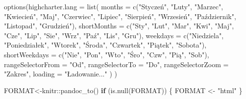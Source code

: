 \documentclass[
  polish,
  letterpaper,
  DIV=11,
  numbers=noendperiod]{scrartcl}
\newenvironment{Shaded}{\begin{snugshade}}{\end{snugshade}}
\newcommand{\AttributeTok}[1]{\textcolor[rgb]{0.40,0.45,0.13}{#1}}
\newcommand{\ControlFlowTok}[1]{\textcolor[rgb]{0.00,0.23,0.31}{\textbf{#1}}}
\newcommand{\FunctionTok}[1]{\textcolor[rgb]{0.28,0.35,0.67}{#1}}
\newcommand{\NormalTok}[1]{\textcolor[rgb]{0.00,0.23,0.31}{#1}}
\newcommand{\OtherTok}[1]{\textcolor[rgb]{0.00,0.23,0.31}{#1}}
\newcommand{\SpecialCharTok}[1]{\textcolor[rgb]{0.37,0.37,0.37}{#1}}
\newcommand{\StringTok}[1]{\textcolor[rgb]{0.13,0.47,0.30}{#1}}
\begin{document}
\begin{Shaded}
\begin{Highlighting}[]
\FunctionTok{options}\NormalTok{(}\AttributeTok{highcharter.lang =} \FunctionTok{list}\NormalTok{(}
    \AttributeTok{months =} \FunctionTok{c}\NormalTok{(}\StringTok{"Styczeń"}\NormalTok{, }\StringTok{"Luty"}\NormalTok{, }\StringTok{"Marzec"}\NormalTok{, }\StringTok{"Kwiecień"}\NormalTok{, }\StringTok{"Maj"}\NormalTok{, }\StringTok{"Czerwiec"}\NormalTok{, }
               \StringTok{"Lipiec"}\NormalTok{, }\StringTok{"Sierpień"}\NormalTok{, }\StringTok{"Wrzesień"}\NormalTok{, }\StringTok{"Październik"}\NormalTok{, }
               \StringTok{"Listopad"}\NormalTok{, }\StringTok{"Grudzień"}\NormalTok{),}
    \AttributeTok{shortMonths =} \FunctionTok{c}\NormalTok{(}\StringTok{"Sty"}\NormalTok{, }\StringTok{"Lut"}\NormalTok{, }\StringTok{"Mar"}\NormalTok{, }\StringTok{"Kwi"}\NormalTok{, }\StringTok{"Maj"}\NormalTok{, }\StringTok{"Cze"}\NormalTok{, }
                    \StringTok{"Lip"}\NormalTok{, }\StringTok{"Sie"}\NormalTok{, }\StringTok{"Wrz"}\NormalTok{, }\StringTok{"Paź"}\NormalTok{, }\StringTok{"Lis"}\NormalTok{, }\StringTok{"Gru"}\NormalTok{),}
    \AttributeTok{weekdays =} \FunctionTok{c}\NormalTok{(}\StringTok{"Niedziela"}\NormalTok{, }\StringTok{"Poniedziałek"}\NormalTok{, }\StringTok{"Wtorek"}\NormalTok{, }\StringTok{"Środa"}\NormalTok{, }\StringTok{"Czwartek"}\NormalTok{, }
                 \StringTok{"Piątek"}\NormalTok{, }\StringTok{"Sobota"}\NormalTok{),}
    \AttributeTok{shortWeekdays =} \FunctionTok{c}\NormalTok{(}\StringTok{"Nie"}\NormalTok{, }\StringTok{"Pon"}\NormalTok{, }\StringTok{"Wto"}\NormalTok{, }\StringTok{"Śro"}\NormalTok{, }\StringTok{"Czw"}\NormalTok{, }\StringTok{"Pią"}\NormalTok{, }\StringTok{"Sob"}\NormalTok{),}
    \AttributeTok{rangeSelectorFrom =} \StringTok{"Od"}\NormalTok{,}
    \AttributeTok{rangeSelectorTo =} \StringTok{"Do"}\NormalTok{,}
    \AttributeTok{rangeSelectorZoom =} \StringTok{"Zakres"}\NormalTok{,}
    \AttributeTok{loading =} \StringTok{"Ładowanie..."}
\NormalTok{  )}
\NormalTok{)}

\NormalTok{FORMAT}\OtherTok{\textless{}{-}}\NormalTok{knitr}\SpecialCharTok{::}\FunctionTok{pandoc\_to}\NormalTok{()}
\ControlFlowTok{if}\NormalTok{ (}\FunctionTok{is.null}\NormalTok{(FORMAT)) \{}
\NormalTok{  FORMAT }\OtherTok{\textless{}{-}} \StringTok{"html"}
\NormalTok{\}}
\end{Highlighting}
\end{Shaded}
\end{document}
